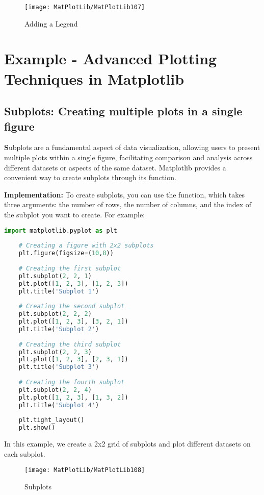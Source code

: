 \begin{figure}[h]
	\centering
	\texttt{[image: MatPlotLib/MatPlotLib107]}
	\caption{Adding a Legend}\label{Matplotlib07}
\end{figure}


\section{Example - Advanced Plotting Techniques in Matplotlib}

\subsection{Subplots: Creating multiple plots in a single figure}

\textbf Subplots are a fundamental aspect of data visualization, allowing users to present multiple plots within a single figure, facilitating comparison and analysis across different datasets or aspects of the same dataset. Matplotlib provides a convenient way to create subplots through its  function.

\textbf{Implementation:} To create subplots, you can use the  function, which takes three arguments: the number of rows, the number of columns, and the index of the subplot you want to create. \cite{Scipymatplotlib:2024} For example:

\begin{lstlisting}[language=Python]
	import matplotlib.pyplot as plt
	
	# Creating a figure with 2x2 subplots
	plt.figure(figsize=(10,8))
	
	# Creating the first subplot
	plt.subplot(2, 2, 1)
	plt.plot([1, 2, 3], [1, 2, 3])
	plt.title('Subplot 1')
	
	# Creating the second subplot
	plt.subplot(2, 2, 2)
	plt.plot([1, 2, 3], [3, 2, 1])
	plt.title('Subplot 2')
	
	# Creating the third subplot
	plt.subplot(2, 2, 3)
	plt.plot([1, 2, 3], [2, 3, 1])
	plt.title('Subplot 3')
	
	# Creating the fourth subplot
	plt.subplot(2, 2, 4)
	plt.plot([1, 2, 3], [1, 3, 2])
	plt.title('Subplot 4')
	
	plt.tight_layout()
	plt.show()
\end{lstlisting}

In this example, we create a 2x2 grid of subplots and plot different datasets on each subplot.

\begin{figure}[h]
	\centering
	\texttt{[image: MatPlotLib/MatPlotLib108]}
	\caption{Subplots}\label{Matplotlib08}
\end{figure}

